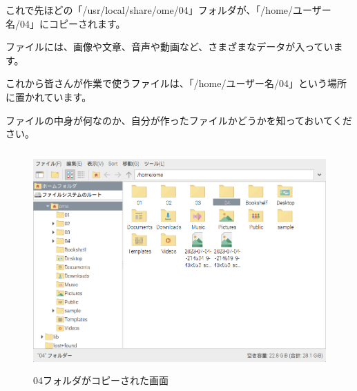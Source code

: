 これで先ほどの「/usr/local/share/ome/04」フォルダが、「/home/ユーザー名/04」にコピーされます。

ファイルには、画像や文章、音声や動画など、さまざまなデータが入っています。

これから皆さんが作業で使うファイルは、「/home/ユーザー名/04」という場所に置かれています。

ファイルの中身が何なのか、自分が作ったファイルかどうかを知っておいてください。



\begin{figure}[H]
  \begin{center}
    \includegraphics[keepaspectratio,width=11.232cm,height=8.424cm]{text04-img/s_ome04d.png}
    \caption{04フォルダがコピーされた画面}
  \end{center}
  \label{fig:prog_menu}
\end{figure}





